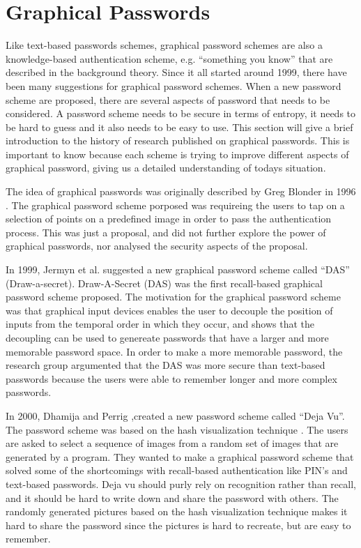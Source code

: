 \section{Graphical Passwords}


  Like text-based passwords schemes, graphical password schemes are also a knowledge-based authentication scheme, e.g. ``something you know'' that are described in the background theory. Since it all started around 1999, there have been many suggestions for graphical password schemes. When a new password scheme are proposed, there are several aspects of password that needs to be considered. A password scheme needs to be secure in terms of entropy, it needs to be hard to guess and it also needs to be easy to use. This section will give a brief introduction to the history of research published on graphical passwords. This is important to know because each scheme is trying to improve different aspects of graphical password, giving us a detailed understanding of todays situation. 

  The idea of graphical passwords was originally described by Greg Blonder in 1996 \cite{Blonder}. The graphical password scheme porposed was requireing the users to tap on a selection of points on a predefined image in order to pass the authentication process. This was just a proposal, and did not further explore the power of graphical passwords, nor analysed the security aspects of the proposal. 

  In 1999, Jermyn et al. \cite{Jermyn} suggested a new graphical password scheme called ``DAS'' (Draw-a-secret). Draw-A-Secret (DAS) was the first recall-based graphical password scheme proposed. The motivation for the graphical password scheme was that graphical input devices enables the user to decouple the position of inputs from the temporal order in which they occur, and shows that the decoupling can be used to genereate passwords that have a larger and more memorable password space. In order to make a more memorable password, the research group argumented that the DAS was more secure than text-based passwords because the users were able to remember longer and more complex passwords. 

  In 2000, Dhamija and Perrig \cite{DejaVu},created a new password scheme called ``Deja Vu''. The password scheme was based on the hash visualization technique \cite{HashVisualization}. The users are asked to select a sequence of images from a random set of images that are generated by a program. They wanted to make a graphical password scheme that solved some of the shortcomings with recall-based authentication like PIN's and text-based passwords. Deja vu should purly rely on recognition rather than recall, and it should be hard to write down and share the password with others. The randomly generated pictures based on the hash visualization technique makes it hard to share the password since the pictures is hard to recreate, but are easy to remember. 

